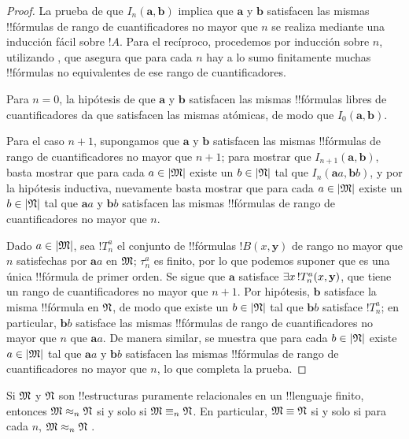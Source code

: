 \documentclass[../../../include/open-logic-section]{subfiles}
\begin{document}
\begin{proof}
  La prueba de que $I_n(\mathbf{a},\mathbf{b})$ implica que $\mathbf{a}$ y $\mathbf{b}$ satisfacen las mismas !!{fórmulas} de rango de cuantificadores no mayor que $n$ se realiza mediante una inducción fácil sobre $!A$. Para el recíproco, procedemos por inducción sobre $n$, utilizando , que asegura que para cada $n$ hay a lo sumo finitamente muchas !!{fórmulas} no equivalentes de ese rango de cuantificadores.

  Para $n=0$, la hipótesis de que $\mathbf{a}$ y $\mathbf{b}$ satisfacen las mismas !!{fórmulas} libres de cuantificadores da que satisfacen las mismas atómicas, de modo que $I_0(\mathbf{a},\mathbf{b})$.

  Para el caso $n+1$, supongamos que $\mathbf{a}$ y $\mathbf{b}$ satisfacen las mismas !!{fórmulas} de rango de cuantificadores no mayor que $n+1$; para mostrar que $I_{n+1}(\mathbf{a},\mathbf{b})$, basta mostrar que para cada $a \in \Domain M$ existe un $b \in \Domain N$ tal que $I_n(\mathbf{a}a,\mathbf{b}b)$, y por la hipótesis inductiva, nuevamente basta mostrar que para cada $a \in \Domain M$ existe un $b \in \Domain N$ tal que $\mathbf{a}a$ y $\mathbf{b}b$ satisfacen las mismas !!{fórmulas} de rango de cuantificadores no mayor que $n$.

  Dado $a \in \Domain M$, sea $!T^a_n$ el conjunto de !!{fórmulas} $!B(x,\mathbf{y})$ de rango no mayor que $n$ satisfechas por $\mathbf{a}a$ en $\Struct{M}$; $\tau^a_n$ es finito, por lo que podemos suponer que es una única !!{fórmula} de primer orden. Se sigue que $\mathbf{a}$ satisface $\lexists[x][!T^a_n(x,\mathbf{y})]$, que tiene un rango de cuantificadores no mayor que $n+1$. Por hipótesis, $\mathbf{b}$ satisface la misma !!{fórmula} en $\Struct{N}$, de modo que existe un $b \in \Domain N$ tal que $\mathbf{b}b$ satisface $!T^a_n$; en particular, $\mathbf{b}b$ satisface las mismas !!{fórmulas} de rango de cuantificadores no mayor que $n$ que $\mathbf{a}a$. De manera similar, se muestra que para cada $b \in \Domain N$ existe $a\in \Domain M$ tal que $\mathbf{a}a$ y $\mathbf{b}b$ satisfacen las mismas !!{fórmulas} de rango de cuantificadores no mayor que $n$, lo que completa la prueba.
\end{proof}

\begin{cor}
  Si $\Struct{M}$ y $\Struct{N}$ son !!{estructuras} puramente relacionales en un !!{lenguaje} finito, entonces $\Struct{M} \approx_n\Struct{N}$ si y solo si $\Struct{M} \elemequiv[n] \Struct{N}$. En particular, $\Struct{M} \elemequiv \Struct{N}$ si y solo si para cada $n$, $\Struct{M} \approx_n \Struct{N}$ .
\end{cor}
\end{document}
